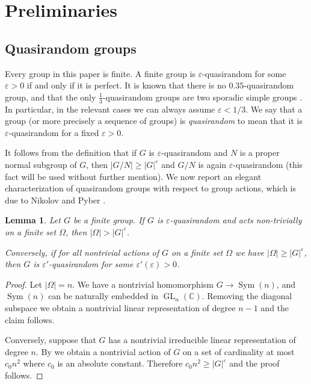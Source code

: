 \documentclass[11pt,reqno]{amsart}
\numberwithin{equation}{section}
\newtheorem{lemma}[theorem]{Lemma}
\theoremstyle{definition}
\theoremstyle{remark}
\newcommand{\Sym}{\mathop{\mathrm{Sym}}}
\newcommand{\GL}{\mathop{\mathrm{GL}}}
\begin{document}
\vspace{0.1cm}
\section{Preliminaries} \label{secPre}

\subsection{Quasirandom groups} 

Every group in this paper is finite.
A finite  group is $\varepsilon$-quasirandom for some $\varepsilon >0$ if and only if it is perfect.
It is known that there is no $0.35$-quasirandom group,
and that the only $\tfrac{1}{3}$-quasirandom groups are two sporadic simple groups \cite[Corollary~D]{BS25}.
In particular, in the relevant cases we can always assume $\varepsilon < 1/3$.
We say that a group (or more precisely a sequence of groups)
is \emph{quasirandom} to mean that it is $\varepsilon$-quasirandom for a fixed $\varepsilon >0$.

It follows from the definition that if $G$ is $\varepsilon$-quasirandom and $N$ is a proper normal subgroup of $G$,
then $|G/N| \geq |G|^\varepsilon$ and $G/N$ is again $\varepsilon$-quasirandom
(this fact will be used without further mention).
We now report an elegant characterization of quasirandom groups with respect to group actions,
which is due to Nikolov and Pyber \cite{NP11}.

\begin{lemma} \label{lemQSet}
Let $G$ be a finite group.
If $G$ is $\varepsilon$-quasirandom and acts non-trivially on a finite set $\Omega$,
then $|\Omega| > |G|^\varepsilon$.

Conversely, if for all nontrivial actions of $G$ on a finite set $\Omega$ we have $|\Omega| \geq |G|^\varepsilon$,
then $G$ is $\varepsilon'$-quasirandom for some $\varepsilon'(\varepsilon) >0$.
\end{lemma}
\begin{proof}
Let $|\Omega|=n$.
We have a nontrivial homomorphism $G \to \Sym(n)$,
and $\Sym(n)$ can be naturally embedded in $\GL_n(\mathbb{C})$.
Removing the diagonal subspace we obtain a nontrivial linear representation of degree $n-1$ and the claim follows.

Conversely, suppose that $G$ has a nontrivial irreducible linear representation of degree $n$.
By \cite[Theorem~4]{NP11} we obtain a nontrivial action of $G$ on a set of cardinality at most $c_0 n^2$
where $c_0$ is an absolute constant.
Therefore $c_0 n^2 \geq |G|^\varepsilon$ and the proof follows.
\end{proof}
\end{document}
